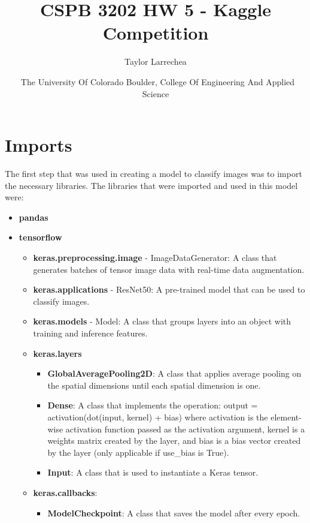 \documentclass[
	a4paper, %
	10pt, %
	unnumberedsections, %
	twoside, %
]{LTJournalArticle}
\title{CSPB 3202 HW 5 - Kaggle Competition\\} %
\author{%
	Taylor Larrechea
}
\date{\footnotesize\ The University Of Colorado Boulder, College Of Engineering And Applied Science}
\begin{document}
\maketitle %


\section{Imports}

The first step that was used in creating a model to classify images was to import the necessary libraries. The libraries that were imported and used in this model were:

\begin{itemize}
	\item \textbf{pandas}
	\item \textbf{tensorflow}
	\begin{itemize}
		\item \textbf{keras.preprocessing.image} - ImageDataGenerator: A class that generates batches of tensor image data with real-time data augmentation.
		\item \textbf{keras.applications} - ResNet50: A pre-trained model that can be used to classify images.
		\item \textbf{keras.models} - Model: A class that groups layers into an object with training and inference features.
		\item \textbf{keras.layers}
		\begin{itemize}
			\item \textbf{GlobalAveragePooling2D}: A class that applies average pooling on the spatial dimensions until each spatial dimension is one.
			\item \textbf{Dense}: A class that implements the operation: output = activation(dot(input, kernel) + bias) where activation is the element-wise activation function passed as the activation 
			argument, kernel is a weights matrix created by the layer, and bias is a bias vector created by the layer (only applicable if use\_bias is True).
			\item \textbf{Input}: A class that is used to instantiate a Keras tensor.
		\end{itemize}
		\item \textbf{keras.callbacks}:
		\begin{itemize}
			\item \textbf{ModelCheckpoint}: A class that saves the model after every epoch.
		\end{itemize}
	\end{itemize}
\end{itemize}
\end{document}
